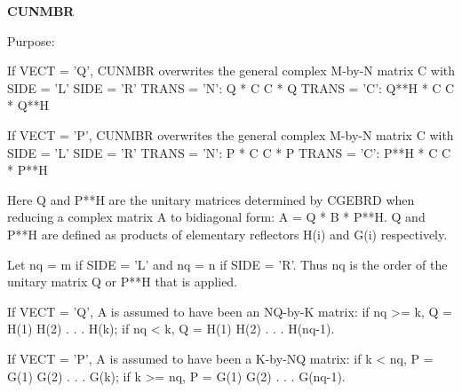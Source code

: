 {\bfseries C\+U\+N\+M\+B\+R} 

 \begin{DoxyParagraph}{Purpose\+: }
\begin{DoxyVerb} If VECT = 'Q', CUNMBR overwrites the general complex M-by-N matrix C
 with
                 SIDE = 'L'     SIDE = 'R'
 TRANS = 'N':      Q * C          C * Q
 TRANS = 'C':      Q**H * C       C * Q**H

 If VECT = 'P', CUNMBR overwrites the general complex M-by-N matrix C
 with
                 SIDE = 'L'     SIDE = 'R'
 TRANS = 'N':      P * C          C * P
 TRANS = 'C':      P**H * C       C * P**H

 Here Q and P**H are the unitary matrices determined by CGEBRD when
 reducing a complex matrix A to bidiagonal form: A = Q * B * P**H. Q
 and P**H are defined as products of elementary reflectors H(i) and
 G(i) respectively.

 Let nq = m if SIDE = 'L' and nq = n if SIDE = 'R'. Thus nq is the
 order of the unitary matrix Q or P**H that is applied.

 If VECT = 'Q', A is assumed to have been an NQ-by-K matrix:
 if nq >= k, Q = H(1) H(2) . . . H(k);
 if nq < k, Q = H(1) H(2) . . . H(nq-1).

 If VECT = 'P', A is assumed to have been a K-by-NQ matrix:
 if k < nq, P = G(1) G(2) . . . G(k);
 if k >= nq, P = G(1) G(2) . . . G(nq-1).\end{DoxyVerb}
 
\end{DoxyParagraph}

